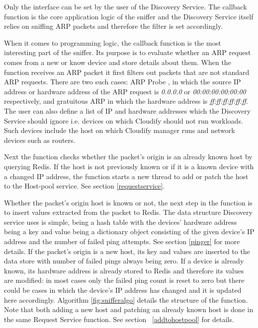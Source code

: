 Only the interface can be set by the user of the Discovery Service. The callback function is the core application logic of the sniffer and the Discovery Service itself relies on sniffing ARP packets and therefore the filter is set accordingly.

When it comes to programming logic, the callback function is the most interesting part of the sniffer. Its purpose is to evaluate whether an ARP request comes from a new or know device and store details about them. When the function receives an ARP packet it first filters out packets that are not standard ARP requests. There are two such cases: ARP Probe \cite{rfc5227}, in which the source IP address or hardware address of the ARP request is \textit{0.0.0.0} or \textit{00:00:00:00:00:00} respectively, and gratuitous ARP in which the hardware address is \textit{ff:ff:ff:ff:ff:ff}. The user can also define a list of IP and hardware addresses which the Discovery Service should ignore i.e. devices on which Cloudify should not run workloads. Such devices include the host on which Cloudify manager runs and network devices such as routers.

Next the function checks whether the packet's origin is an already known host by querying Redis. If the host is not previously known or if it is a known device with a changed IP address, the function starts a new thread to add or patch the host to the Host-pool service. See section \ref{requestservice}.

Whether the packet's origin host is known or not, the next step in the function is to insert values extracted from the packet to Redis. The data structure Discovery service uses is simple, being a hash table with the devices' hardware address being a key and value being a dictionary object consisting of the given device's IP address and the number of failed ping attempts. See section \ref{pinger} for more details. If the packet's origin is a new host, its key and values are inserted to the data store with number of failed pings always being zero. If a device is already known, its hardware address is already stored to Redis and therefore its values are modified: in most cases only the failed ping count is reset to zero but there could be cases in which the device's IP address has changed and it is updated here accordingly. Algorithm \ref{fig:snifferalgo} details the structure of the function. Note that both adding a new host and patching an already known host is done in the same Request Service function. See section ~\ref{addtohostpool} for details.

